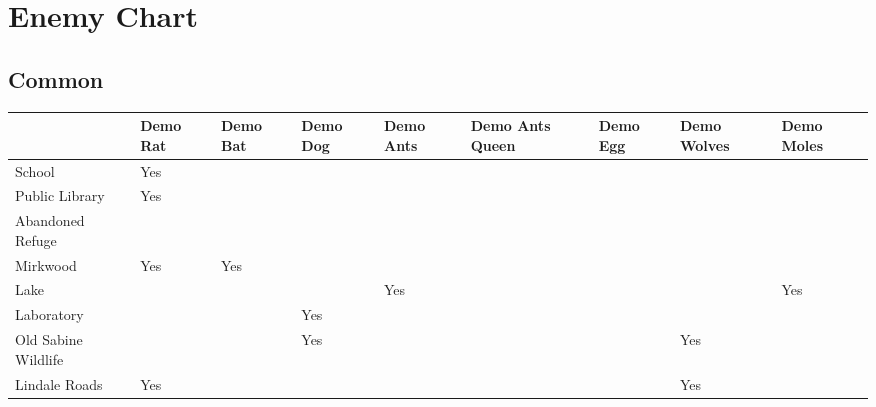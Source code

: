 \section{Enemy Chart}

\vspace*{0.2cm}

\subsection{Common}

\vspace*{0.2cm}

\begin{center}
	\begin{tabular}[c]{| p{3.8cm} | p{1cm} | p{1cm} | p{1cm} | p{1cm} | p{1.7cm} | p{1cm} | p{1cm} | p{1cm} | }
		\hline
		                                          & Demo Rat & Demo Bat & Demo Dog & Demo Ants & Demo Ants Queen & Demo Egg & Demo Wolves & Demo Moles \\ \hline
		                 School                   & Yes      &          &          &           &                 &          &             &            \\ \hline
		             Public Library               & Yes      &          &          &           &                 &          &             &            \\ \hline
		            Abandoned Refuge              &          &          &          &           &                 &          &             &            \\ \hline
		                Mirkwood                  & Yes      & Yes      &          &           &                 &          &             &            \\ \hline
		                  Lake                    &          &          &          & Yes       &                 &          &             & Yes        \\ \hline
		               Laboratory                 &          &          & Yes      &           &                 &          &             &            \\ \hline
		           Old Sabine Wildlife            &          &          &  Yes        &        &                 &          &  Yes           &            \\ \hline
		              Lindale Roads               &  Yes        &          &          &           &                 &       & Yes         &            \\ \hline

\end{tabular}
\end{center}

